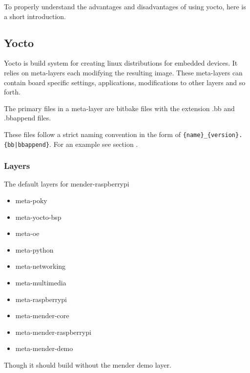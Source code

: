 \documentclass[../../main.tex]{subfiles}
\begin{document}
To properly understand the advantages and disadvantages of using yocto, here is a short introduction.

\subsection{Yocto}%
\label{sub:yocto}

Yocto is build system for creating linux distributions for embedded devices. It relies on meta-layers
each modifying the resulting image. These meta-layers can contain board specific settings,
applications, modifications to other layers and so forth.

The primary files in a meta-layer are bitbake files with the extension .bb and .bbappend files.

These files follow a strict naming convention in the form of
\texttt{\{name\}\_\{version\}.\{bb|bbappend\}}. For an example see section .



%
%
%
%
%

\subsubsection{Layers}%
\label{ssub:layers}

The default layers for mender-raspberrypi
\begin{itemize}
	\item meta-poky
	\item meta-yocto-bsp
	\item meta-oe
	\item meta-python
	\item meta-networking
	\item meta-multimedia
	\item meta-raspberrypi
	\item meta-mender-core
	\item meta-mender-raspberrypi
	\item meta-mender-demo
\end{itemize}
Though it should build without the mender demo layer.


\end{document}
